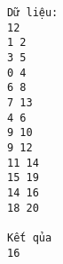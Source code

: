 \begin{verbatim}
Dữ liệu:
12
1 2
3 5
0 4
6 8
7 13
4 6
9 10
9 12
11 14
15 19
14 16
18 20

Kết qủa
16
\end{verbatim}